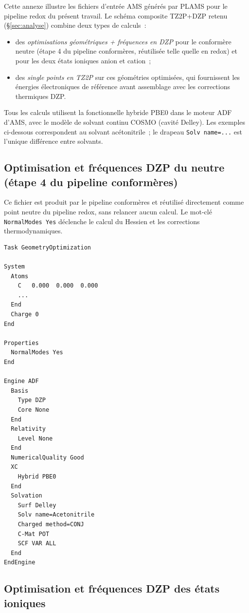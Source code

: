 Cette annexe illustre les fichiers d'entrée AMS générés par PLAMS pour le pipeline redox du présent travail. Le schéma composite TZ2P+DZP retenu (§\ref{sec:analyse}) combine deux types de calculs~:
\begin{itemize}[noitemsep]
\item des \emph{optimisations géométriques + fréquences en DZP} pour le conformère neutre (étape 4 du pipeline conformères, réutilisée telle quelle en redox) et pour les deux états ioniques anion et cation~;
\item des \emph{single points en TZ2P} sur ces géométries optimisées, qui fournissent les énergies électroniques de référence avant assemblage avec les corrections thermiques DZP.
\end{itemize}
Tous les calculs utilisent la fonctionnelle hybride PBE0 dans le moteur ADF d'AMS, avec le modèle de solvant continu COSMO (cavité Delley). Les exemples ci-dessous correspondent au solvant acétonitrile~; le drapeau \texttt{Solv name=...} est l'unique différence entre solvants.

\subsection{Optimisation et fréquences DZP du neutre (étape 4 du pipeline conformères)}

Ce fichier est produit par le pipeline conformères et réutilisé directement comme \og{}point neutre\fg{} du pipeline redox, sans relancer aucun calcul. Le mot-clé \texttt{NormalModes Yes} déclenche le calcul du Hessien et les corrections thermodynamiques.

\begin{lstlisting}
Task GeometryOptimization

System
  Atoms
    C   0.000  0.000  0.000
    ...
  End
  Charge 0
End

Properties
  NormalModes Yes
End

Engine ADF
  Basis
    Type DZP
    Core None
  End
  Relativity
    Level None
  End
  NumericalQuality Good
  XC
    Hybrid PBE0
  End
  Solvation
    Surf Delley
    Solv name=Acetonitrile
    Charged method=CONJ
    C-Mat POT
    SCF VAR ALL
  End
EndEngine
\end{lstlisting}

\subsection{Optimisation et fréquences DZP des états ioniques}

